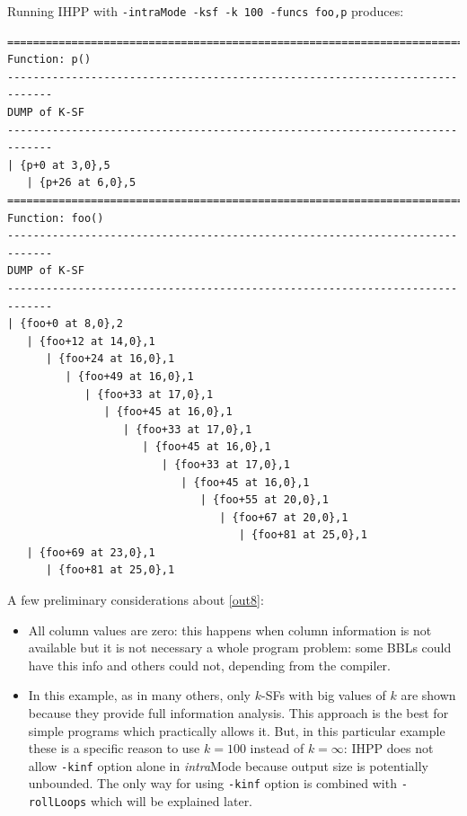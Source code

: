 \documentclass[a4paper,10pt]{report}
\begin{document}
\noindent
Running IHPP with \verb|-intraMode -ksf -k 100 -funcs foo,p| produces:

\begin{lstlisting}[label=out8, caption={IHPP partial output for \texttt{prog4}},frame=bottomline]
=============================================================================
Function: p()
-----------------------------------------------------------------------------
DUMP of K-SF
-----------------------------------------------------------------------------
| {p+0 at 3,0},5
   | {p+26 at 6,0},5
=============================================================================
Function: foo()
-----------------------------------------------------------------------------
DUMP of K-SF
-----------------------------------------------------------------------------
| {foo+0 at 8,0},2
   | {foo+12 at 14,0},1
      | {foo+24 at 16,0},1
         | {foo+49 at 16,0},1
            | {foo+33 at 17,0},1
               | {foo+45 at 16,0},1
                  | {foo+33 at 17,0},1
                     | {foo+45 at 16,0},1
                        | {foo+33 at 17,0},1
                           | {foo+45 at 16,0},1
                              | {foo+55 at 20,0},1
                                 | {foo+67 at 20,0},1
                                    | {foo+81 at 25,0},1
   | {foo+69 at 23,0},1
      | {foo+81 at 25,0},1

\end{lstlisting}

\noindent
A few preliminary considerations about \cref{out8}:
\renewcommand{\labelitemi}{$-$}

\begin{itemize}
\item All column values are zero: this happens when 
column information is not available but it is not necessary a whole program 
problem: some BBLs could have this info and others could not, depending from the compiler.
\item In this example, as in many others, only $k$-SFs with big values of $k$
are shown because they provide full information analysis. This approach is the best for 
simple programs which practically allows it. 
But, in this particular example these is a specific reason to use $k=100$ instead of $k=\infty$: IHPP does not allow \verb|-kinf| option alone in \emph{intra}Mode because
output size is potentially unbounded. The only way for using \verb|-kinf| option is combined with \verb|-rollLoops| which will be explained later.
\end{itemize}
\renewcommand{\labelitemi}{$\bullet$}
\end{document}
